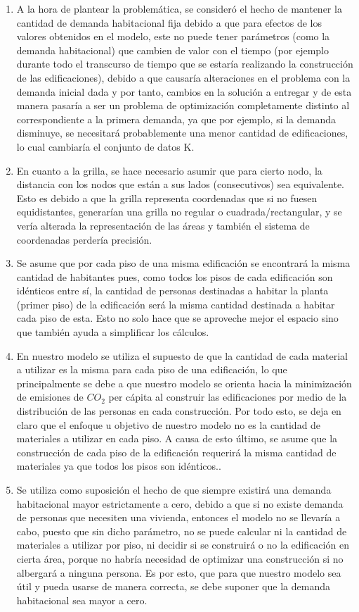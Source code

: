 \documentclass[letterpaper]{article}
\begin{document}
\begin{enumerate}
	\item A la hora de plantear la problemática, se consideró el hecho de mantener la cantidad de demanda habitacional fija debido a que para efectos de los valores obtenidos en el modelo, este no puede tener parámetros (como la demanda habitacional) que cambien de valor con el tiempo
	(por ejemplo durante todo el transcurso de tiempo que se estaría realizando la construcción de las edificaciones), debido a que causaría alteraciones en el problema con la demanda inicial dada y por tanto, cambios en la solución a entregar y de esta manera pasaría a ser un problema
	de optimización completamente distinto al correspondiente a la primera demanda, ya que por ejemplo, si la demanda disminuye, se necesitará probablemente una menor cantidad de edificaciones, lo cual cambiaría el conjunto de datos K.

	\item En cuanto a la grilla, se hace necesario asumir que para cierto nodo, la distancia con los nodos que están a sus lados (consecutivos) sea equivalente. Esto es debido a que la grilla representa coordenadas que si no fuesen equidistantes, generarían una grilla no regular o
	cuadrada/rectangular, y se vería alterada la representación de las áreas y también el sistema de coordenadas perdería precisión.
	
	\item Se asume que por cada piso de una misma edificación se encontrará la misma cantidad de habitantes pues, como todos los pisos de cada edificación son idénticos entre sí, la cantidad de personas destinadas a habitar la planta (primer piso) de la edificación será la misma cantidad
	destinada a habitar cada piso de esta. Esto no solo hace que se aproveche mejor el espacio sino que también ayuda a simplificar los cálculos.
	
	\item En nuestro modelo se utiliza el supuesto de que la cantidad de cada material a utilizar es la misma para cada piso de una edificación, lo que principalmente se debe a que nuestro modelo se orienta hacia la minimización de emisiones de $CO_{2}$ per cápita al construir las edificaciones
	por medio de la distribución de las personas en cada construcción. Por todo esto, se deja en claro que el enfoque u objetivo de nuestro modelo no es la cantidad de materiales a utilizar en cada piso. A causa de esto último, se asume que la construcción de cada piso de la edificación
	requerirá la misma cantidad de materiales ya que todos los pisos son idénticos..

	\item Se utiliza como suposición el hecho de que siempre existirá una demanda habitacional mayor estrictamente a cero, debido a que si no existe demanda de personas que necesiten una vivienda, entonces el modelo no se llevaría a cabo, puesto que sin dicho parámetro, no se puede calcular
	ni la cantidad de materiales a utilizar por piso, ni decidir si se construirá o no la edificación en cierta área, porque no habría necesidad de optimizar una construcción si no albergará a ninguna persona. Es por esto, que para que nuestro modelo sea útil y pueda usarse de manera correcta,
	se debe suponer que la demanda habitacional sea mayor a cero.
\end{enumerate}
\end{document}
